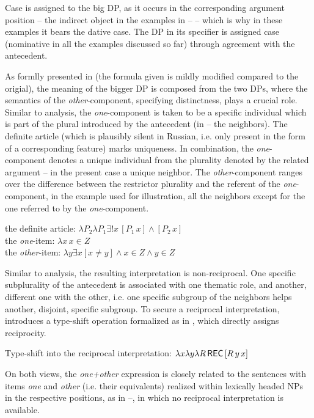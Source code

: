 \documentclass[output=paper,colorlinks,citecolor=brown]{langscibook}
\begin{document}
\noindent Case is assigned to the big DP, as it occurs in the corresponding argument position -- the indirect object in the examples in -- -- which is why in these examples it bears the dative case. The DP in its specifier is assigned case (nominative in all the examples discussed so far) through agreement with the antecedent.

As formlly presented in  (the formula given is mildly modified compared to the origial), the meaning of the bigger DP is composed from the two DPs, where the semantics of the \textit{other}-component, specifying distinctness, plays a crucial role. Similar to  analysis, the \textit{one}-component is taken to be a specific individual which is part of the plural introduced by the antecedent (in -- the neighbors). The definite article (which is plausibly silent in Russian, i.e. only present in the form of a corresponding feature) marks uniqueness. In combination, the \textit{one}-component denotes a unique individual from the plurality denoted by the related argument -- in the present case a unique neighbor. The \textit{other}-component ranges over the difference between the restrictor plurality and the referent of the \textit{one}-component, in the example used for illustration, all the neighbors except for the one referred to by the \textit{one}-component.

\ea\label{ex:Definite}
\ea the definite article: $\lambda P_2 \lambda P_1 \exists ! x \, [P_1 \, x] \wedge [P_2 \, x]$\\
\ex the \textit{one}-item: $\lambda x \, x \in Z$\\
\ex the \textit{other}-item: $\lambda y \exists x [x \neq y] \wedge x \in Z \wedge y \in Z$
\z \z

\noindent Similar to  %
analysis, the resulting interpretation is non-reciprocal. One specific subplurality of the antecedent is associated with one thematic role, and another, different one with the other, i.e. one specific subgroup of the neighbors helps another, disjoint, specific subgroup. To secure a reciprocal interpretation, \citet{z14} %
introduces a type-shift operation formalized as in , which directly assigns reciprocity. 

\ea\label{ex:Definite}
Type-shift into the reciprocal interpretation: $\lambda x \lambda y \lambda R \, \cnst{rec}\, [R \, y \, x]$
\z

\noindent On both views, the \textit{one+other} expression is closely related to the sentences with items \textit{one} and \textit{other} (i.e. their equivalents) realized within lexically headed NPs in the respective positions, as in --, in which no reciprocal interpretation is available.
\end{document}
